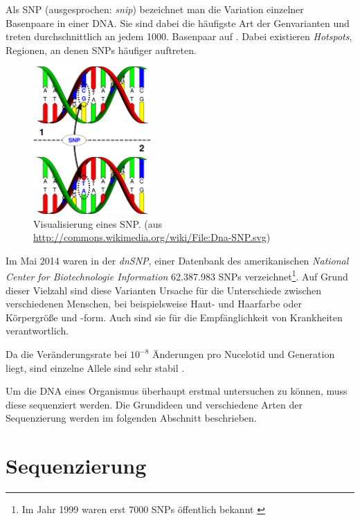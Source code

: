 Als SNP (ausgesprochen: \textit{snip}) bezeichnet man die Variation einzelner Basenpaare in einer DNA. Sie sind dabei die häufigste Art der Genvarianten und treten durchschnittlich an jedem 1000. Basenpaar auf \citep{Knippers2006}. Dabei existieren \textit{Hotspots}, Regionen, an denen SNPs häufiger auftreten. 
\begin{figure}[H]
	\begin{center}
		\includegraphics[width=0.4\textwidth]{bilder/DNA_SNP}
	\end{center}
	\caption[Visualisierung eines SNP. (aus \protect\url{http://commons.wikimedia.org/wiki/File:Dna-SNP.svg})]{Visualisierung eines SNP. (aus \protect\url{http://commons.wikimedia.org/wiki/File:Dna-SNP.svg})}
	\label{fig:bio:muta:snp}
\end{figure}
Im Mai 2014 waren in der \textit{dnSNP}, einer Datenbank des amerikanischen \textit{National Center for Biotechnologie Information} \citet{NCBI2014} 62.387.983 SNPs verzeichnet\footnote{Im Jahr 1999 waren erst 7000 SNPs öffentlich bekannt \citep{Brookes1999}}. Auf Grund dieser Vielzahl sind diese Varianten Ursache für die Unterschiede zwischen verschiedenen Menschen, bei beispielsweise Haut- und Haarfarbe oder Körpergröße und -form. Auch sind sie für die Empfänglichkeit von Krankheiten verantwortlich.

Da die Veränderungsrate bei $10^{-8}$ Änderungen pro Nucelotid und Generation liegt, sind einzelne Allele sind sehr stabil \citep{Brookes1999} \citep{Li1996}. 

Um die DNA eines Organismus überhaupt erstmal untersuchen zu können, muss diese sequenziert werden. Die Grundideen und verschiedene Arten der Sequenzierung werden im folgenden Abschnitt beschrieben.
\newpage
\section{Sequenzierung}
\label{sec:bio:seq}

